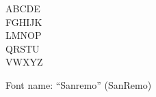 \documentclass[a4paper]{article}
\begin{document}
\begin{center}
\fontsize{60pt}{72pt}
  ABCDE \\
  FGHIJK \\
  LMNOP \\
  QRSTU \\
  VWXYZ \\
\end{center}
\vfill
\begin{center}
Font name: ``Sanremo'' (SanRemo)
\end{center}
\end{document}
